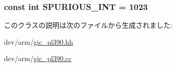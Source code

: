 \label{classPl390_ab882d232a4976cf54e9cb73b44e1988f}
\hypertarget{classPl390_a5c2ca5d88991c1b1cd77340bf56fdaef}{
\subsubsection[{SPURIOUS\_\-INT}]{\setlength{\rightskip}{0pt plus 5cm}const int {\bf SPURIOUS\_\-INT} = 1023}}
\label{classPl390_a5c2ca5d88991c1b1cd77340bf56fdaef}


このクラスの説明は次のファイルから生成されました:\begin{DoxyCompactItemize}
\item 
dev/arm/\hyperlink{gic__pl390_8hh}{gic\_\-pl390.hh}\item 
dev/arm/\hyperlink{gic__pl390_8cc}{gic\_\-pl390.cc}\end{DoxyCompactItemize}
